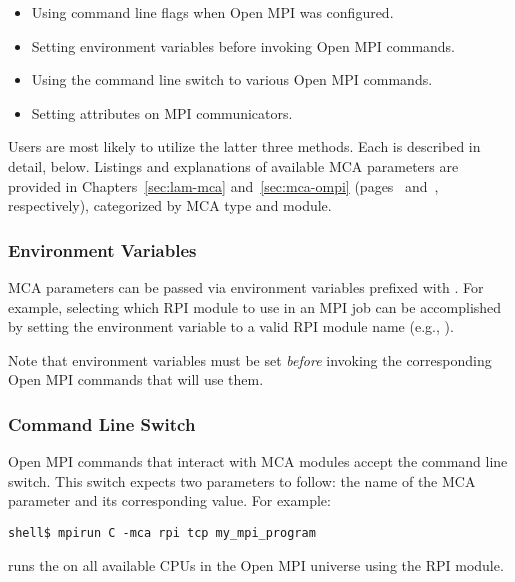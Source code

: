 \begin{itemize}
\item Using command line flags when Open MPI was configured.
\item Setting environment variables before invoking Open MPI commands.
\item Using the  command line switch to various Open MPI
  commands.
\item Setting attributes on MPI communicators.
\end{itemize}

Users are most likely to utilize the latter three methods.  Each is
described in detail, below.  Listings and explanations of available
MCA parameters are provided in Chapters~\ref{sec:lam-mca}
and~\ref{sec:mca-ompi} (pages~\pageref{sec:lam-mca}
and~\pageref{sec:mca-ompi}, respectively), categorized by MCA type and
module.


\subsubsection{Environment Variables}

MCA parameters can be passed via environment variables prefixed with
.  For example, selecting which RPI module
to use in an MPI job can be accomplished by setting the environment
variable  to a valid RPI module name
(e.g., ).

Note that environment variables must be set {\em before} invoking the
corresponding Open MPI commands that will use them.


\subsubsection{ Command Line Switch}

Open MPI commands that interact with MCA modules accept the
 command line switch.  This switch expects two parameters
to follow: the name of the MCA parameter and its corresponding value.
For example:

\lstset{style=lam-cmdline}
\begin{lstlisting}
shell$ mpirun C -mca rpi tcp my_mpi_program
\end{lstlisting}

\noindent runs the  on all available CPUs in
the Open MPI universe using the  RPI module.

